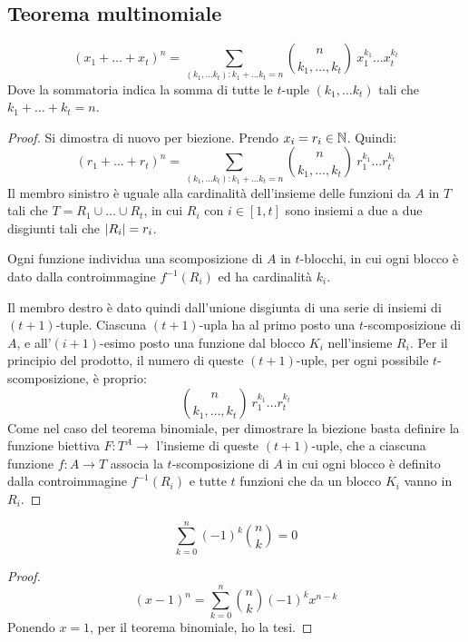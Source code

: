 \subsection{Teorema multinomiale}
\begin{prop}
\begin{equation}
(x_1 + \dots + x_t)^n = \sum_{(k_1, \dots k_t) : k_1 + \dots k_t = n}
\binom{n}{k_1, \dots, k_t} \ x_1^{k_1} \dots x_t^{k_t}
\end{equation}
Dove la sommatoria indica la somma di tutte le $t$-uple $(k_1, \dots k_t)$ tali che $k_1 + \dots + k_t = n$.
\end{prop}
\begin{proof}
Si dimostra di nuovo per biezione. Prendo $x_i = r_i \in \mathbb{N}$. Quindi:
\[
(r_1 + \dots + r_t)^n = \sum_{(k_1, \dots k_t) : k_1 + \dots k_t = n}
\binom{n}{k_1, \dots, k_t} \ r_1^{k_1} \dots r_t^{k_t}
\]
Il membro sinistro \`e uguale alla cardinalit\`a dell'insieme delle funzioni da $A$ in $T$ tali che $T = R_1 \cup \dots \cup R_t$, in cui $R_i $ con $i \in [1, t]$ sono insiemi a due a due disgiunti tali che $\left\lvert{R_i}\right\rvert = r_i$.

Ogni funzione individua una scomposizione di $A$ in $t$-blocchi, in cui ogni blocco \`e dato dalla controimmagine $f^{-1} (R_i)$ ed ha cardinalit\`a $k_i$. 

Il membro destro \`e dato quindi dall'unione disgiunta di una serie di insiemi di $(t+1)$-tuple. Ciascuna $(t+1)$-upla ha al primo posto una $t$-scomposizione di $A$, e all'$(i+1)$-esimo posto una funzione dal blocco $K_i$ nell'insieme $R_i$. Per il principio del prodotto, il numero di queste $(t+1)$-uple, per ogni possibile $t$-scomposizione, \`e proprio:
\[
\binom{n}{k_1, \dots, k_t} \ r_1^{k_1} \dots r_t^{k_t}
\]
Come nel caso del teorema binomiale, per dimostrare la biezione basta definire la funzione biettiva $F : T^A \to$ l'insieme di queste $(t+1)$-uple, che a ciascuna funzione $f : A \to T$ associa la $t$-scomposizione di $A$ in cui ogni blocco \`e definito dalla controimmagine $f^{-1} (R_i)$ e tutte $t$ funzioni che da un blocco $K_i$ vanno in $R_i$.
\end{proof}

\begin{cor}
\[
\sum_{k = 0}^{n} (-1)^k \binom{n}{k} = 0
\]
\end{cor}
\begin{proof}
\[
(x - 1)^n = \sum_{k = 0}^{n} \binom{n}{k} (-1)^k x^{n-k}
\]
Ponendo $x = 1$, per il teorema binomiale, ho la tesi.
\end{proof}

